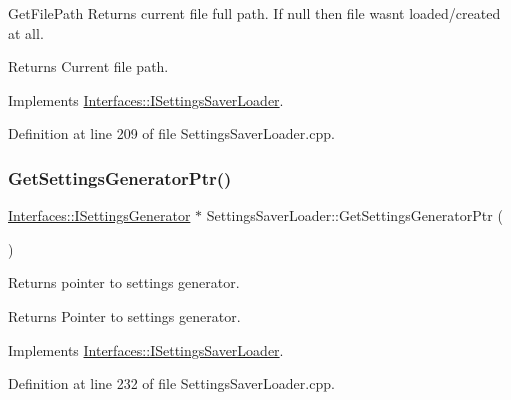 Get\+File\+Path Returns current file full path. If null then file wasn\textquotesingle{}t loaded/created at all. 

\begin{DoxyReturn}{Returns}
Current file path. 
\end{DoxyReturn}


Implements \hyperlink{class_interfaces_1_1_i_settings_saver_loader_a7224c9ffc2d9c6a3b98fb20246e97cc3}{Interfaces\+::\+I\+Settings\+Saver\+Loader}.



Definition at line 209 of file Settings\+Saver\+Loader.\+cpp.

\mbox{\label{class_settings_saver_loader_aa6b0a9b4f42335b03341a13f8bfff845}} 
\subsubsection{\texorpdfstring{Get\+Settings\+Generator\+Ptr()}{GetSettingsGeneratorPtr()}}
{\footnotesize\ttfamily \hyperlink{class_interfaces_1_1_i_settings_generator}{Interfaces\+::\+I\+Settings\+Generator} $\ast$ Settings\+Saver\+Loader\+::\+Get\+Settings\+Generator\+Ptr (\begin{DoxyParamCaption}{ }\end{DoxyParamCaption})\hspace{0.3cm}{\ttfamily [virtual]}}



Returns pointer to settings generator. 

\begin{DoxyReturn}{Returns}
Pointer to settings generator. 
\end{DoxyReturn}


Implements \hyperlink{class_interfaces_1_1_i_settings_saver_loader_a73c8012dc63ca02d65a013ca901840ba}{Interfaces\+::\+I\+Settings\+Saver\+Loader}.



Definition at line 232 of file Settings\+Saver\+Loader.\+cpp.

\mbox{\label{class_settings_saver_loader_a35574bdfc340a148245ea8017c59f2eb}} 
